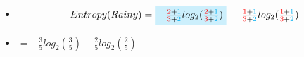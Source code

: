 \documentclass[xcolor=table]{beamer}
\begin{document}
\begin{frame}
\begin{itemize} \itemsep1pt \parskip0pt 
  \item[] {\scriptsize \begin{equation*}
Entropy(Rainy) = 
        \tikz[baseline]{
            \node[fill=cyan!20,anchor=base]
            {$ -\frac{\color{red}{2}\color{black}{+}\color{cyan}{1}}{\color{red}{3}\color{black}{+}\color{cyan}{2}}log_2{(\frac{\color{red}{2}\color{black}{+}\color{cyan}{1}}{\color{red}{3}\color{black}{+}\color{cyan}{2}}})$};
        } -
        \tikz[baseline]{
            \node[anchor=base]
            {$\frac{\color{red}{1}\color{black}{+}\color{cyan}{1}}{\color{red}{3}\color{black}{+}\color{cyan}{2}}log_2{(\frac{\color{red}{1}\color{black}{+}\color{cyan}{1}}{\color{red}{3}\color{black}{+}\color{cyan}{2}}})$};
        }
\end{equation*}}
  \item[] \hspace{42mm} {\scriptsize$ = -\frac{3}{5}log_2{(\frac{3}{5})} - \frac{2}{5}log_2{(\frac{2}{5})}$}
\end{itemize}

\end{frame}
\end{document}
